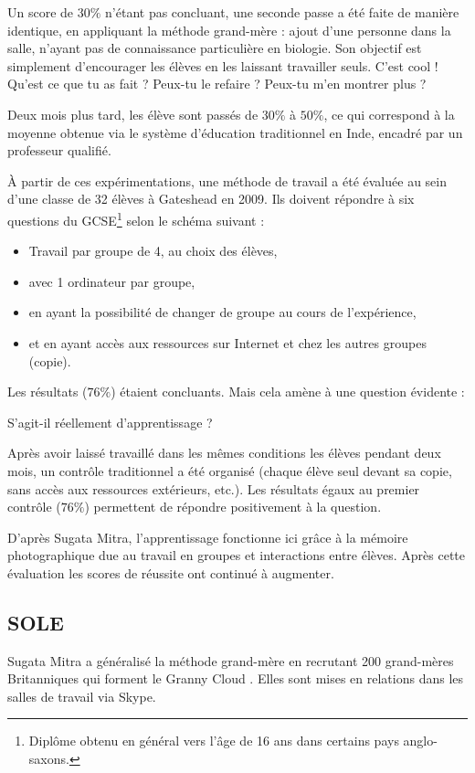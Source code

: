 Un score de $30\%$ n'étant pas concluant, une seconde passe a été faite de manière identique, en appliquant la \og méthode grand-mère \fg{} : ajout d'une personne dans la salle, n'ayant pas de connaissance particulière en biologie. Son objectif est simplement d'encourager les élèves en les laissant travailler seuls. \og C'est cool ! \fg{} \og Qu'est ce que tu as fait ? \fg{} \og Peux-tu le refaire ? \fg{} \og Peux-tu m'en montrer plus ? \fg{} 

Deux mois plus tard, les élève sont passés de $30\%$ à $50\%$, ce qui correspond à la moyenne obtenue via le système d'éducation traditionnel en Inde, encadré par un professeur qualifié.

À partir de ces expérimentations, une méthode de travail a été évaluée au sein d'une classe de 32 élèves à Gateshead en 2009. Ils doivent répondre à six questions du \gls{GCSE}\footnote{Diplôme obtenu en général vers l'âge de 16 ans dans certains pays anglo-saxons.} selon le schéma suivant : 

\begin{itemize}
  \item Travail par groupe de 4, au choix des élèves,
  \item avec 1 ordinateur par groupe,
  \item en ayant la possibilité de changer de groupe au cours de l'expérience,
  \item et en ayant accès aux ressources sur Internet et chez les autres groupes (copie).
\end{itemize}

Les résultats ($76\%$) étaient concluants. Mais cela amène à une question évidente : 
\begin{center}
S'agit-il réellement d'apprentissage ?
\end{center}

Après avoir laissé travaillé dans les mêmes conditions les élèves pendant deux mois, un contrôle traditionnel a été organisé (chaque élève seul devant sa copie, sans accès aux ressources extérieurs, etc.). Les résultats égaux au premier contrôle ($76\%$) permettent de répondre positivement à la question.

D'après Sugata Mitra, l'apprentissage fonctionne ici grâce à la mémoire photographique due au travail en groupes et interactions entre élèves. Après cette évaluation les scores de réussite ont continué à augmenter.


\subsection{\gls{SOLE}}
Sugata Mitra a généralisé la méthode grand-mère en recrutant 200 grand-mères Britanniques qui forment le \og Granny Cloud \fg{}. Elles sont mises en relations dans les salles de travail via Skype.

